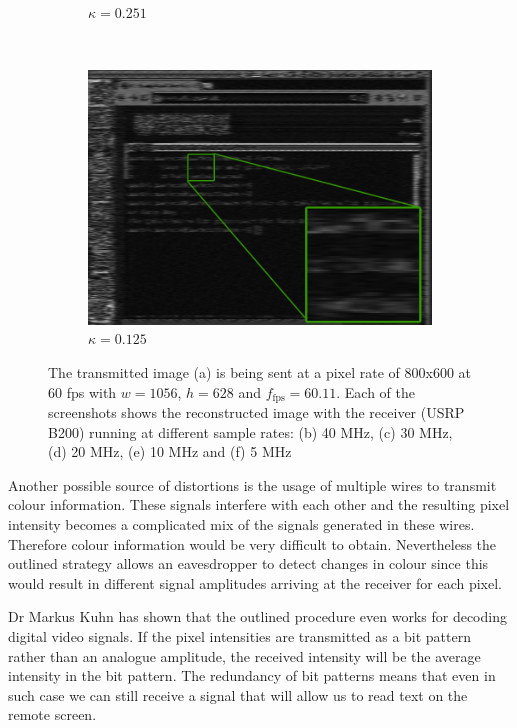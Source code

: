 \documentclass[a4paper,12pt,twoside,openright]{report}
\begin{document}
\begin{figure}[p!]
\begin{subfigure}[b]{0.45\textwidth}
  \caption{$\kappa = 0.251$}
\end{subfigure} ~
\begin{subfigure}[b]{0.45\textwidth}
  \includegraphics[width=\textwidth]{sr_5MHz_at_190MHz}
  \caption{$\kappa = 0.125$}
\end{subfigure}
\caption{The transmitted image (a) is being sent at a pixel rate of 800x600 at 60 fps with $w = 1056$, $h = 628$ and $f_\text{fps} = 60.11$. Each of the screenshots shows the reconstructed image with the receiver (USRP B200) running at different sample rates: (b) 40 MHz, (c) 30 MHz, (d) 20 MHz, (e) 10 MHz and (f) 5 MHz}
\label{fig:samplerates}
\end{figure}

Another possible source of distortions is the usage of multiple wires to transmit colour information. These signals interfere with each other and the resulting pixel intensity becomes a complicated mix of the signals generated in these wires. Therefore colour information would be very difficult to obtain. Nevertheless the outlined strategy allows an eavesdropper to detect changes in colour since this would result in different signal amplitudes arriving at the receiver for each pixel.

Dr Markus Kuhn has shown that the outlined procedure even works for decoding digital video signals\cite{kuhn2005electromagnetic}. If the pixel intensities are transmitted as a bit pattern rather than an analogue amplitude, the received intensity will be the average intensity in the bit pattern. The redundancy of bit patterns means that even in such case we can still receive a signal that will allow us to read text on the remote screen. 
\end{document}
